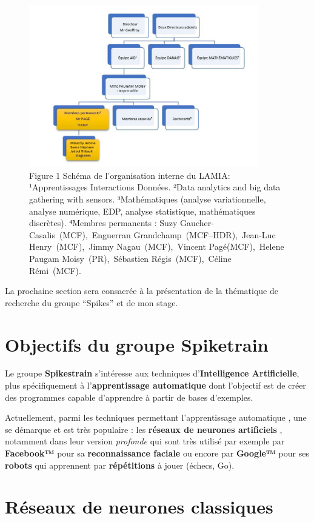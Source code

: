 \begin{figure}[h!]
\centering
\includegraphics[width=10cm]{./images/orga.jpg}
\caption{Figure 1 Schéma de l'organisation interne du LAMIA:
¹Apprentissages Interactions Données. ²Data analytics and big data
gathering with sensors. ³Mathématiques (analyse variationnelle, analyse
numérique, EDP, analyse statistique, mathématiques discrètes). ⁴Membres
permanents : Suzy Gaucher-Casalis~(MCF),~Enguerran
Grandchamp~(MCF--HDR),~Jean-Luc Henry~(MCF),~Jimmy Nagau~(MCF),~Vincent
Pagé(MCF),~Helene Paugam Moisy~(PR),~Sébastien Régis~(MCF),~Céline
Rémi~(MCF).}
\end{figure}

La prochaine section sera consacrée à la présentation de la thématique
de recherche du groupe ``Spikes'' et de mon stage.


\hypertarget{Objectif_Spike}{%
\section{Objectifs du groupe Spiketrain}\label{Objectif_Spiketrain}}

Le groupe \textbf{Spikestrain} s'intéresse aux techniques
d'\textbf{Intelligence Artificielle}, plus spécifiquement à
l'\textbf{apprentissage automatique} dont l'objectif est de créer des
programmes capable d'apprendre à partir de bases d'exemples.

Actuellement, parmi les techniques permettant l'apprentissage
automatique , une se démarque et est très populaire : les
\textbf{réseaux de neurones artificiels} , notamment dans leur version
\emph{profonde} qui sont très utilisé par exemple par \textbf{Facebook™}
pour sa \textbf{reconnaissance faciale} ou encore par \textbf{Google™}
pour ses \textbf{robots} qui apprennent par \textbf{répétitions} à jouer
(échecs, Go).

\hypertarget{ruxe9seaux-de-neurones-classiques-et-impulsionnels}{%
\section{Réseaux de neurones classiques}\label{ruxe9seaux-de-neurones-classiques}}

